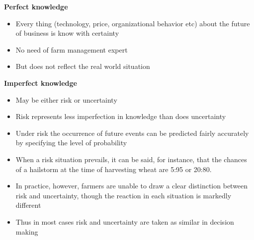 \documentclass[12pt,ignorenonframetext,aspectratio=169]{beamer}
\providecommand{\tightlist}{%
  \setlength{\itemsep}{0pt}\setlength{\parskip}{0pt}}
\begin{document}
\begin{frame}{}
\protect\hypertarget{section-3}{}
\footnotesize

\textbf{Perfect knowledge}

\begin{itemize}
\tightlist
\item
  Every thing (technology, price, organizational behavior etc) about the
  future of business is know with certainty
\item
  No need of farm management expert
\item
  But does not reflect the real world situation
\end{itemize}

\textbf{Imperfect knowledge}

\begin{itemize}
\tightlist
\item
  May be either risk or uncertainty
\item
  Risk represents less imperfection in knowledge than does uncertainty
\item
  Under risk the occurrence of future events can be predicted fairly
  accurately by specifying the level of probability
\item
  When a risk situation prevails, it can be said, for instance, that the
  chances of a hailstorm at the time of harvesting wheat are 5:95 or
  20:80.
\item
  In practice, however, farmers are unable to draw a clear distinction
  between risk and uncertainty, though the reaction in each situation is
  markedly different
\item
  Thus in most cases risk and uncertainty are taken as similar in
  decision making
\end{itemize}
\end{frame}
\end{document}
